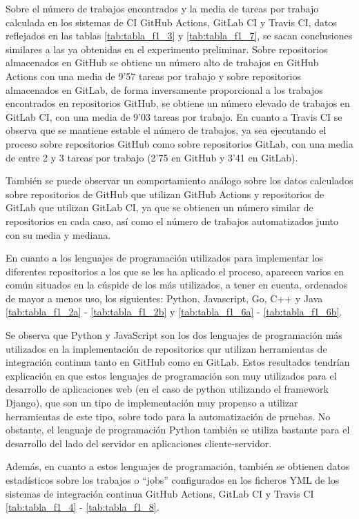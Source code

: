 Sobre el número de trabajos encontrados y la media de tareas por trabajo calculada en los sistemas de CI GitHub Actions, GitLab CI y Travis CI, datos reflejados en las tablas \ref{tab:tabla_f1_3} y \ref{tab:tabla_f1_7}, se sacan conclusiones similares a las ya obtenidas en el experimento preliminar. Sobre repositorios almacenados en GitHub se obtiene un número alto de trabajos en GitHub Actions con una media de 9'57 tareas por trabajo y sobre repositorios almacenados en GitLab, de forma inversamente proporcional a los trabajos encontrados en repositorios GitHub, se obtiene un número elevado de trabajos en GitLab CI, con una media de 9'03 tareas por trabajo. En cuanto a Travis CI se observa que se mantiene estable el número de trabajos, ya sea ejecutando el proceso sobre repositorios GitHub como sobre repositorios GitLab, con una media de entre 2 y 3 tareas por trabajo (2'75 en GitHub y 3'41 en GitLab).

También se puede observar un comportamiento análogo sobre los datos calculados sobre repositorios de GitHub que utilizan GitHub Actions y repositorios de GitLab que utilizan GitLab CI, ya que se obtienen un número similar de repositorios en cada caso, así como el número de trabajos automatizados junto con su media y mediana.

En cuanto a los lenguajes de programación utilizados para implementar los diferentes repositorios a los que se les ha aplicado el proceso, aparecen varios en común situados en la cúspide de los más utilizados, a tener en cuenta, ordenados de mayor a menos uso, los siguientes: Python, Javascript, Go, C++ y Java \ref{tab:tabla_f1_2a} - \ref{tab:tabla_f1_2b} y \ref{tab:tabla_f1_6a} - \ref{tab:tabla_f1_6b}.

Se observa que Python y JavaScript son los dos lenguajes de programación más utilizados en la implementación de repositorios qur utilizan herramientas de integración continua tanto en GitHub como en GitLab. Estos resultados tendrían explicación en que estos lenguajes de programación son muy utilizados para el desarrollo de aplicaciones web (en el caso de python utilizando el framework Django), que son un tipo de implementación muy propenso a utilizar herramientas de este tipo, sobre todo para la automatización de pruebas. No obstante, el lenguaje de programación Python también se utiliza bastante para el desarrollo del lado del servidor en aplicaciones cliente-servidor. 

Además, en cuanto a estos lenguajes de programación, también se obtienen datos estadísticos sobre los trabajos o ``jobs'' configurados en los ficheros YML de los sistemas de integración continua GitHub Actions, GitLab CI y Travis CI \ref{tab:tabla_f1_4} - \ref{tab:tabla_f1_8}.

